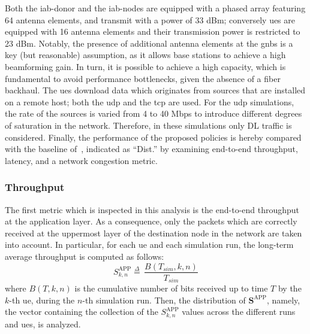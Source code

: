 
Both the \gls{iab}-donor and the \gls{iab}-nodes are equipped with a phased array featuring 64 antenna elements, and transmit with a power of 33 dBm; conversely \glspl{ue} are equipped with 16 antenna elements and their transmission power is restricted to 23 dBm. Notably, the presence of additional antenna elements at the \glspl{gnb} is a key (but reasonable) assumption, as it allows base stations to achieve a high beamforming gain. In turn, it is possible to achieve a high capacity, which is fundamental to avoid performance bottlenecks, given the absence of a fiber backhaul.
The \glspl{ue} download data which originates from sources that are installed on a remote host; both the \gls{udp} and the \gls{tcp} are used. For the \gls{udp} simulations, the rate of the sources is varied from 4 to 40 Mbps to introduce different degrees of saturation in the network. Therefore, in these simulations only DL traffic is considered.
Finally, the performance of the proposed policies is hereby compared with the baseline of~\cite{polese2018end}, indicated as ``Dist.'' by examining end-to-end throughput, latency, and a network congestion metric.

\subsubsection{Throughput}
\label{subsec_thr}

The first metric which is inspected in this analysis is the end-to-end throughput at the application layer. As a consequence, only the packets which are correctly received at the uppermost layer of the destination node in the network are taken into account. In particular, for each \gls{ue} and each simulation run, the long-term average throughput is computed as follows:
\[ S^{\mathrm{APP}}_{k, n} \mathop = \limits^{\Delta} \, \frac{B(T_{sim}, k, n)}{T_{sim}} \]
where $B(T, k, n)$ is the cumulative number of bits received up to time $T$ by the $k$-th \gls{ue}, during the $n$-th simulation run. Then, the distribution of 
$\mathbf{S}^{\mathrm{APP}}$, namely, the vector containing the collection of the $S^{\mathrm{APP}}_{k, n}$ values across the different runs and \glspl{ue}, is analyzed.

